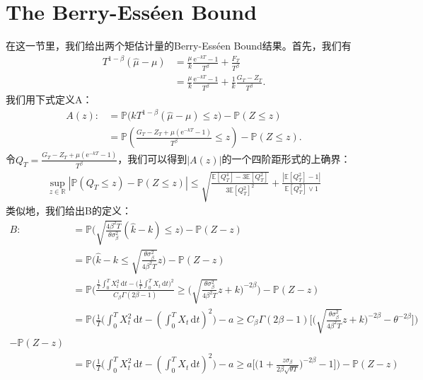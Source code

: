 \documentclass[reqno,a4paper,12pt]{amsart}
\newcommand\me{\mathrm{e}}
\newcommand\dif{\,\mathrm{d}}
\newcommand\mE{\mathbb{E}}
\newcommand\Pro{\mathbb{P}}
\newcommand{\abs}[1]{\left\vert#1\right\vert}
\begin{document}
\section{The Berry-Ess\'{e}en Bound}
在这一节里，我们给出两个矩估计量的Berry-Ess\'{e}en Bound结果。首先，我们有
\begin{equation*}
    \begin{split}
        T^{1-\beta}(\hat{\mu}-\mu)&=\frac{\mu}{k}\frac{\me^{-kT}-1}{T^\beta}+\frac{F_T}{T^\beta}\\
        &=\frac{\mu}{k}\frac{\me^{-kT}-1}{T^\beta}+\frac{1}{k}\frac{G_T-Z_T}{T^\beta}.
    \end{split}
\end{equation*}
我们用下式定义A：
\begin{equation*}
    \begin{split}
        A(z):&=\Pro\biggl(kT^{1-\beta}(\hat{\mu}-\mu)\leq z\biggr)-\Pro(Z\leq z)\\
        &=\Pro(\frac{G_T-Z_T+\mu(\me^{-kT}-1)}{T^\beta}\leq z)-\Pro(Z\leq z).
    \end{split}
\end{equation*}
令$Q_T=\frac{G_T-Z_T+\mu(\me^{-kT}-1)}{T^\beta}$，我们可以得到$\abs{A(z)}$的一个四阶距形式的上确界：
\begin{equation*}
    \begin{split}
        \sup_{z\in\mathbb{R}}\abs{\Pro(Q_T\leq z)-\Pro(Z\leq z)}\leq \sqrt{\frac{\mE[Q^4_T]-3\mE[Q^2_T]}{3\mE[Q_T^2]^2}}+\frac{\abs{\mE[Q^2_T]-1}}{\mE[Q^2_T]\vee 1}
    \end{split}
\end{equation*}
类似地，我们给出B的定义：
\begin{equation*}
    \begin{split}
        B:&=\Pro\biggl(\sqrt{\frac{4\beta^2 T}{\theta\sigma^2_\beta}}(\hat{k}-k)\leq z\biggr)-\Pro(Z-z)\\
        &=\Pro\biggl(\hat{k}-k\leq \sqrt{\frac{\theta\sigma^2_\beta}{4\beta^2 T}}z\biggr)-\Pro(Z-z)\\
        &=\Pro\biggl(\frac{\frac{1}{T}\int_0^T X^2_t\dif t - \bigl(\frac{1}{T}\int_0^T X_t\dif t\bigr)^2}{C_\beta \Gamma(2\beta -1)}\geq \biggl(\sqrt{\frac{\theta\sigma^2_\beta}{4\beta^2 T}}z+k\biggr)^{-2\beta}\biggr)-\Pro(Z-z)\\
        &=\Pro\biggl(\frac{1}{T}\bigl(\int_0^T X^2_t\dif t -(\int_0^T X_t\dif t)^2\bigr)-a\geq C_\beta \Gamma(2\beta -1)\biggl[\biggl(\sqrt{\frac{\theta\sigma^2_\beta}{4\beta^2 T}}z+k\biggr)^{-2\beta}-\theta^{-2\beta}\biggr]\biggr)\\-\Pro(Z-z)\\
        &=\Pro\biggl(\frac{1}{T}\bigl(\int_0^T X^2_t\dif t -(\int_0^T X_t\dif t)^2\bigr)-a\geq a\biggl[\biggl(1+\frac{z\sigma_\beta}{2\beta\sqrt{\theta T}}\biggr)^{-2\beta}-1\biggr]\biggr)-\Pro(Z-z)
    \end{split}
\end{equation*}
\end{document}
